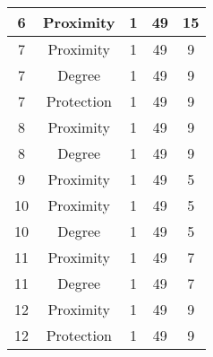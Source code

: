 \documentclass[results.tex]{subfiles}
\begin{document}
\begin{center}
\begin{tabular}{| c || c | c | c | c |}
            \hline
            6                       & Proximity                    & 1                      & 49                      & 15                   \\
            \hline
            7                       & Proximity                    & 1                      & 49                      & 9                    \\
            \hline
            7                       & Degree                       & 1                      & 49                      & 9                    \\
            \hline
            7                       & Protection                   & 1                      & 49                      & 9                    \\
            \hline
            8                       & Proximity                    & 1                      & 49                      & 9                    \\
            \hline
            8                       & Degree                       & 1                      & 49                      & 9                    \\
            \hline
            9                       & Proximity                    & 1                      & 49                      & 5                    \\
            \hline
            10                      & Proximity                    & 1                      & 49                      & 5                    \\
            \hline
            10                      & Degree                       & 1                      & 49                      & 5                    \\
            \hline
            11                      & Proximity                    & 1                      & 49                      & 7                    \\
            \hline
            11                      & Degree                       & 1                      & 49                      & 7                    \\
            \hline
            12                      & Proximity                    & 1                      & 49                      & 9                    \\
            \hline
            12                      & Protection                   & 1                      & 49                      & 9                    \\

\end{tabular}
\end{center}
\end{document}

